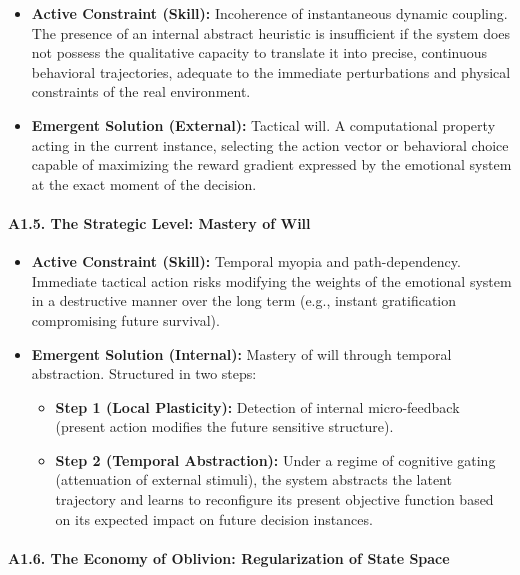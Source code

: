 \documentclass[11pt,a4paper,oneside]{article} %
\providecommand{\tightlist}{%
  \setlength{\itemsep}{0pt}\setlength{\parskip}{0pt}}
\begin{document}
\begin{itemize}
\tightlist
\item
  \textbf{Active Constraint (Skill):} Incoherence of instantaneous
  dynamic coupling. The presence of an internal abstract heuristic is
  insufficient if the system does not possess the qualitative capacity
  to translate it into precise, continuous behavioral trajectories,
  adequate to the immediate perturbations and physical constraints of
  the real environment.
\item
  \textbf{Emergent Solution (External):} Tactical will. A computational
  property acting in the current instance, selecting the action vector
  or behavioral choice capable of maximizing the reward gradient
  expressed by the emotional system at the exact moment of the decision.
\end{itemize}

\hypertarget{a1.5.-the-strategic-level-mastery-of-will}{%
\paragraph{A1.5. The Strategic Level: Mastery of
Will}\label{a1.5.-the-strategic-level-mastery-of-will}}

\begin{itemize}
\tightlist
\item
  \textbf{Active Constraint (Skill):} Temporal myopia and
  path-dependency. Immediate tactical action risks modifying the weights
  of the emotional system in a destructive manner over the long term
  (e.g., instant gratification compromising future survival).
\item
  \textbf{Emergent Solution (Internal):} Mastery of will through
  temporal abstraction. Structured in two steps:

  \begin{itemize}
  \tightlist
  \item
    \textbf{Step 1 (Local Plasticity):} Detection of internal
    micro-feedback (present action modifies the future sensitive
    structure).
  \item
    \textbf{Step 2 (Temporal Abstraction):} Under a regime of cognitive
    gating (attenuation of external stimuli), the system abstracts the
    latent trajectory and learns to reconfigure its present objective
    function based on its expected impact on future decision instances.
  \end{itemize}
\end{itemize}

\hypertarget{a1.6.-the-economy-of-oblivion-regularization-of-state-space}{%
\paragraph{A1.6. The Economy of Oblivion: Regularization of State
Space}\label{a1.6.-the-economy-of-oblivion-regularization-of-state-space}}
\end{document}

